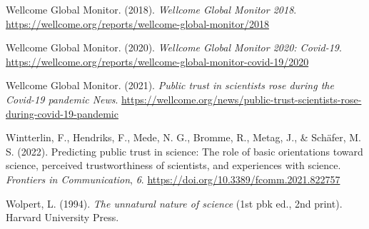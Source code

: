 \documentclass[
  man,
  floatsintext,
  longtable,
  nolmodern,
  notxfonts,
  notimes,
  colorlinks=true,linkcolor=blue,citecolor=blue,urlcolor=blue]{apa7}
\newlength{\cslhangindent}
\newenvironment{CSLReferences}[2] %
 {\begin{list}{}{%
  \setlength{\itemindent}{0pt}
  \setlength{\leftmargin}{0pt}
  \setlength{\parsep}{0pt}
  \ifodd #1
   \setlength{\leftmargin}{\cslhangindent}
   \setlength{\itemindent}{-1\cslhangindent}
  \fi
  \setlength{\itemsep}{#2\baselineskip}}}
 {\end{list}}
\begin{document}
\begin{CSLReferences}{1}{0}
Wellcome Global Monitor. (2018). \emph{Wellcome Global Monitor 2018}.
\url{https://wellcome.org/reports/wellcome-global-monitor/2018}

Wellcome Global Monitor. (2020). \emph{Wellcome Global Monitor 2020:
Covid-19}.
\url{https://wellcome.org/reports/wellcome-global-monitor-covid-19/2020}

Wellcome Global Monitor. (2021). \emph{Public trust in scientists rose
during the Covid-19 pandemic \textbar{} News}.
\url{https://wellcome.org/news/public-trust-scientists-rose-during-covid-19-pandemic}

Wintterlin, F., Hendriks, F., Mede, N. G., Bromme, R., Metag, J., \&
Schäfer, M. S. (2022). Predicting public trust in science: The role of
basic orientations toward science, perceived trustworthiness of
scientists, and experiences with science. \emph{Frontiers in
Communication}, \emph{6}.
\url{https://doi.org/10.3389/fcomm.2021.822757}

Wolpert, L. (1994). \emph{The unnatural nature of science} (1st pbk ed.,
2nd print). Harvard University Press.

\end{CSLReferences}
\end{document}
